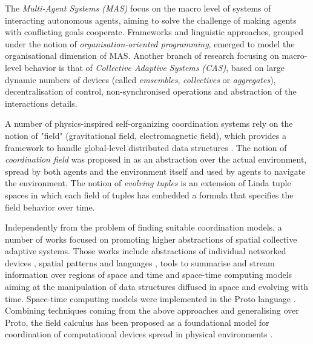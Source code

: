 The \textit{Multi-Agent Systems (MAS)} focus on the macro level of systems of interacting autonomous agents, aiming to solve the challenge of making agents with conflicting goals cooperate. Frameworks and linguistic approaches, grouped under the notion of \textit{organisation-oriented programming}, emerged to model the organisational dimension of MAS. Another branch of research focusing on macro-level behavior is that of \textit{Collective Adaptive Systems (CAS)}, based on large dynamic numbers of devices (called \textit{emsembles}, \textit{collectives} or \textit{aggregates}), decentralisation of control, non-synchronised operations and abstraction of the interactions details.

A number of physics-inspired self-organizing coordination systems rely on the notion of "field" (gravitational field, electromagnetic field), which provides a framework to handle global-level distributed data structures \cite{Survey}. The notion of \textit{coordination field} was proposed in \cite{CoField} as an abstraction over the actual environment, spread by both agents and the environment itself and used by agents to navigate the environment. The notion of \textit{evolving tuples} \cite{EvolvingTuples} is an extension of Linda tuple spaces in which each field of tuples has embedded a formula that specifies the field behavior over time.

Independently from the problem of finding suitable coordination models, a number of works focused on promoting higher abstractions of spatial collective adaptive systems. Those works include abstractions of individual networked devices \cite{Hood}, spatial patterns and languages \cite{GrowingPoint}, tools to summarise and stream information over regions of space \cite{TinyDB} and time and space-time computing models aiming at the manipulation of data structures diffused in space and evolving with time. Space-time computing models were implemented in the Proto language \cite{Proto}. Combining techniques coming from the above approaches and generalising over Proto, the field calculus has been proposed as a foundational model for coordination of computational devices spread in physical environments \cite{Survey}.

